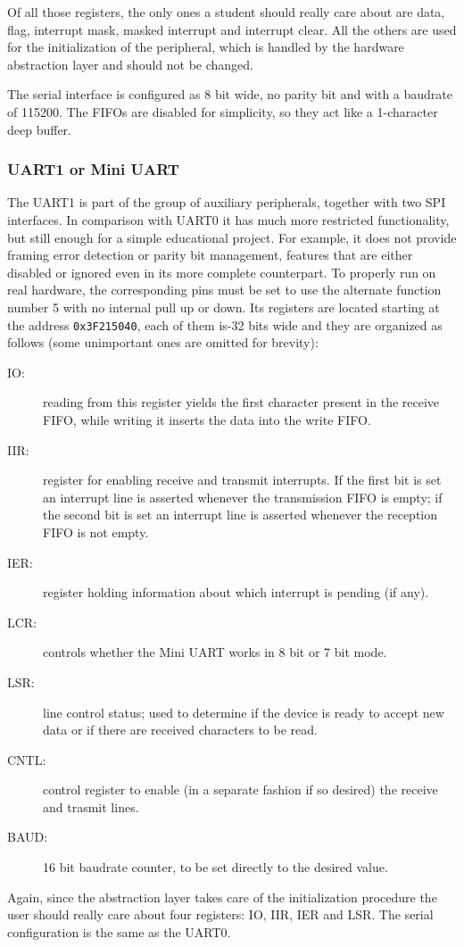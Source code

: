 \documentclass[12pt,a4paper,openright,twoside]{report}
\begin{document}
Of all those registers, the only ones a student should really care about are
data, flag, interrupt mask, masked interrupt and interrupt clear. All the others 
are used for the initialization of the peripheral, which is handled by the 
hardware abstraction layer and should not be changed.

The serial interface is configured as 8 bit wide, no parity bit and with
a baudrate of 115200. The FIFOs are disabled for simplicity, so they act like 
a 1-character deep buffer.

\newpage

\subsubsection{UART1 or Mini UART}
The UART1 is part of the group of auxiliary peripherals, together with two SPI
interfaces. In comparison with UART0 it has much more restricted functionality,
but still enough for a simple educational project. For example, it does not 
provide framing error detection or parity bit management, features that are either
disabled or ignored even in its more complete counterpart.
To properly run on real hardware, the corresponding pins must be set to use the
alternate function number 5 with no internal pull up or down.
Its registers are located starting at the address {\tt 0x3F215040}, each of them is-32 bits
wide and they are organized as follows (some unimportant ones are omitted for brevity):

\begin{description}
    \item[IO:] reading from this register yields the first character present in the
            receive FIFO, while writing it inserts the data into the write FIFO.
    \item[IIR:] register for enabling receive and transmit interrupts. If the first
            bit is set an interrupt line is asserted whenever the transmission FIFO
            is empty; if the second bit is set an interrupt line is asserted whenever
            the reception FIFO is not empty.
    \item[IER:] register holding information about which interrupt is pending (if any).
    \item[LCR:] controls whether the Mini UART works in 8 bit or 7 bit mode.
    \item[LSR:] line control status; used to determine if the device is ready to 
            accept new data or if there are received characters to be read.
    \item[CNTL:] control register to enable (in a separate fashion if so desired)
            the receive and trasmit lines.
    \item[BAUD:] 16 bit baudrate counter, to be set directly to the desired value.
\end{description}
Again, since the abstraction layer takes care of the initialization procedure
the user should really care about four registers: IO, IIR, IER and LSR.
The serial configuration is the same as the UART0.
\end{document}
